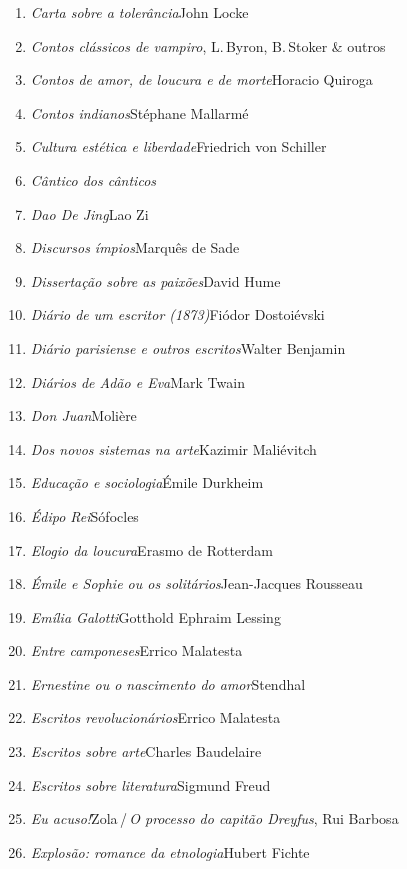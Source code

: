 \begin{enumerate}
\item \textit{Carta sobre a tolerância}\quad John Locke
\item \textit{Contos clássicos de vampiro}, L.\,Byron, B.\,Stoker \& outros
\item \textit{Contos de amor, de loucura e de morte}\quad Horacio Quiroga
\item \textit{Contos indianos}\quad Stéphane Mallarmé
\item \textit{Cultura estética e liberdade}\quad Friedrich von Schiller
\item \textit{Cântico dos cânticos}\quad [Salomão]
\item \textit{Dao De Jing}\quad Lao Zi
\item \textit{Discursos ímpios}\quad Marquês de Sade
\item \textit{Dissertação sobre as paixões}\quad David Hume
\item \textit{Diário de um escritor (1873)}\quad Fiódor Dostoiévski
\item \textit{Diário parisiense e outros escritos}\quad Walter Benjamin
\item \textit{Diários de Adão e Eva}\quad Mark Twain
\item \textit{Don Juan}\quad Molière
\item \textit{Dos novos sistemas na arte}\quad Kazimir Maliévitch
\item \textit{Educação e sociologia}\quad Émile Durkheim
\item \textit{Édipo Rei}\quad Sófocles
\item \textit{Elogio da loucura}\quad Erasmo de Rotterdam
\item \textit{Émile e Sophie ou os solitários}\quad Jean-Jacques Rousseau 
\item \textit{Emília Galotti}\quad Gotthold Ephraim Lessing
\item \textit{Entre camponeses}\quad Errico Malatesta
\item \textit{Ernestine ou o nascimento do amor}\quad Stendhal
\item \textit{Escritos revolucionários}\quad Errico Malatesta
\item \textit{Escritos sobre arte}\quad Charles Baudelaire
\item \textit{Escritos sobre literatura}\quad Sigmund Freud
\item \textit{Eu acuso!}\quad Zola\,/\,\textit{O processo do capitão Dreyfus}, Rui Barbosa
\item \textit{Explosão: romance da etnologia}\quad Hubert Fichte

\end{enumerate}
